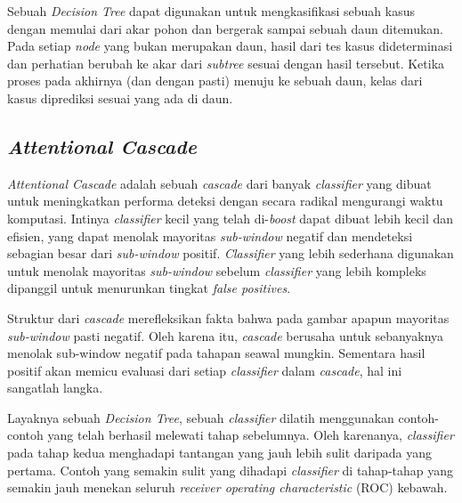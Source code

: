Sebuah \emph{Decision Tree} dapat digunakan untuk mengkasifikasi sebuah kasus 
dengan memulai dari akar pohon dan bergerak sampai sebuah daun ditemukan. 
Pada setiap \emph{node} yang bukan merupakan daun, hasil dari tes kasus 
dideterminasi dan perhatian berubah ke akar dari \emph{subtree} sesuai 
dengan hasil tersebut. Ketika proses pada akhirnya (dan dengan pasti) 
menuju ke sebuah daun, kelas dari kasus diprediksi sesuai yang ada di daun.

\subsection{\emph{Attentional Cascade}}

\emph{Attentional Cascade} adalah sebuah \emph{cascade} dari banyak 
\emph{classifier} yang dibuat untuk meningkatkan performa deteksi dengan secara radikal mengurangi waktu 
komputasi. Intinya \emph{classifier} kecil yang telah di-\emph{boost} dapat dibuat lebih 
kecil dan efisien, yang dapat menolak mayoritas \emph{sub-window} negatif dan 
mendeteksi sebagian besar dari \emph{sub-window} positif. \emph{Classifier} yang lebih 
sederhana digunakan untuk menolak mayoritas \emph{sub-window} sebelum \emph{classifier} 
yang lebih kompleks dipanggil untuk menurunkan tingkat \emph{false positives}.

Struktur dari \emph{cascade} merefleksikan 
fakta bahwa pada gambar apapun mayoritas \emph{sub-window} pasti negatif. 
Oleh karena itu, \emph{cascade} berusaha untuk sebanyaknya menolak sub-window 
negatif pada tahapan seawal mungkin. Sementara hasil positif 
akan memicu evaluasi dari setiap \emph{classifier} dalam \emph{cascade}, 
hal ini sangatlah langka.

Layaknya sebuah \emph{Decision Tree}, sebuah \emph{classifier} dilatih menggunakan 
contoh-contoh yang telah berhasil melewati tahap sebelumnya. Oleh karenanya, 
\emph{classifier} pada tahap kedua menghadapi tantangan yang jauh lebih sulit 
daripada yang pertama. Contoh yang semakin sulit yang dihadapi \emph{classifier} 
di tahap-tahap yang semakin jauh menekan seluruh \emph{receiver operating characteristic} (ROC) 
kebawah.

